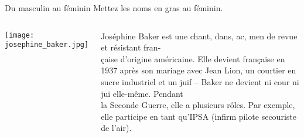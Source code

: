 \begin{frame}{Du masculin au féminin}
  Mettez les noms \alert{en gras} au féminin.
  \vspace{0.5cm}
  \begin{columns}
      \begin{center}
        \texttt{[image: josephine\_baker.jpg]}
      \end{center}
      Joséphine Baker est une \alert{chant\only<-1>{eur}\only<2->{\textcolor{red}{euse}}}, \alert{dans}, \alert{ac}, \alert{men} de revue et \alert{résistant} fran-\\çaise d'origine américaine.
      Elle devient française en 1937 après son mariage avec Jean Lion, un courtier en sucre industriel et un juif -- Baker ne devient ni \alert{cour} ni \alert{jui} elle-même.
      Pendant\\la Seconde Guerre, elle a plusieurs rôles.
      Par exemple, elle participe en tant qu'IPSA (\alert{infirm} pilote secouriste de l'air).
      
  \end{columns}
\end{frame}